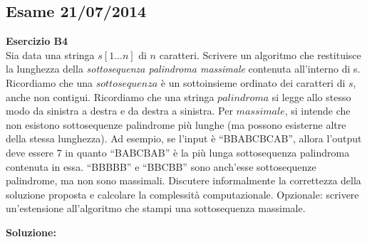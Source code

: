 \documentclass[../cheatSheetAlgoritmi.tex]{subfiles}
\begin{document}
\subsection{Esame 21/07/2014}
\textbf{Esercizio B4}\\
Sia data una stringa $s[1...n]$ di $n$ caratteri. Scrivere un algoritmo che restituisce la lunghezza della \emph{sottosequenza palindroma massimale} contenuta all'interno di s. Ricordiamo che una $sottosequenza$ è un sottoinsieme ordinato dei caratteri di $s$, anche non contigui. Ricordiamo che una stringa $palindroma$ si legge allo stesso modo da sinistra a destra e da destra a sinistra. Per $massimale$, si intende che non esistono sottosequenze palindrome più lunghe (ma possono esisterne altre della stessa lunghezza). Ad esempio, se l'input è “BBABCBCAB”, allora l'output deve essere 7 in quanto “BABCBAB” è la più lunga sottosequenza palindroma contenuta in essa. “BBBBB” e “BBCBB” sono anch'esse sottosequenze palindrome, ma non sono massimali. Discutere informalmente la correttezza della soluzione proposta e calcolare la complessità computazionale. Opzionale: scrivere un'estensione all'algoritmo che stampi una sottosequenza massimale.

\textbf{Soluzione:}
\end{document}
